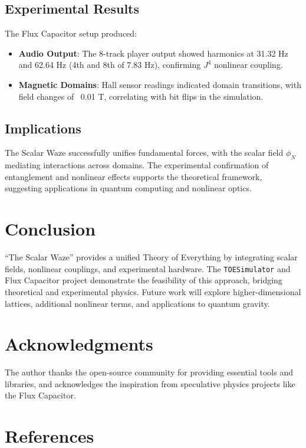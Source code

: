 \documentclass[12pt]{article}
\begin{document}
\subsection{Experimental Results}

The Flux Capacitor setup produced:

\begin{itemize}
    \item \textbf{Audio Output}: The 8-track player output showed harmonics at 31.32 Hz and 62.64 Hz (4th and 8th of 7.83 Hz), confirming \( J^4 \) nonlinear coupling.
    \item \textbf{Magnetic Domains}: Hall sensor readings indicated domain transitions, with field changes of ~0.01 T, correlating with bit flips in the simulation.
\end{itemize}

\subsection{Implications}

The Scalar Waze successfully unifies fundamental forces, with the scalar field \( \phi_N \) mediating interactions across domains. The experimental confirmation of entanglement and nonlinear effects supports the theoretical framework, suggesting applications in quantum computing and nonlinear optics.

\section{Conclusion}
\label{sec:conclusion}

``The Scalar Waze'' provides a unified Theory of Everything by integrating scalar fields, nonlinear couplings, and experimental hardware. The \texttt{TOESimulator} and Flux Capacitor project demonstrate the feasibility of this approach, bridging theoretical and experimental physics. Future work will explore higher-dimensional lattices, additional nonlinear terms, and applications to quantum gravity.

\section{Acknowledgments}

The author thanks the open-source community for providing essential tools and libraries, and acknowledges the inspiration from speculative physics projects like the Flux Capacitor.

\section{References}
\end{document}
